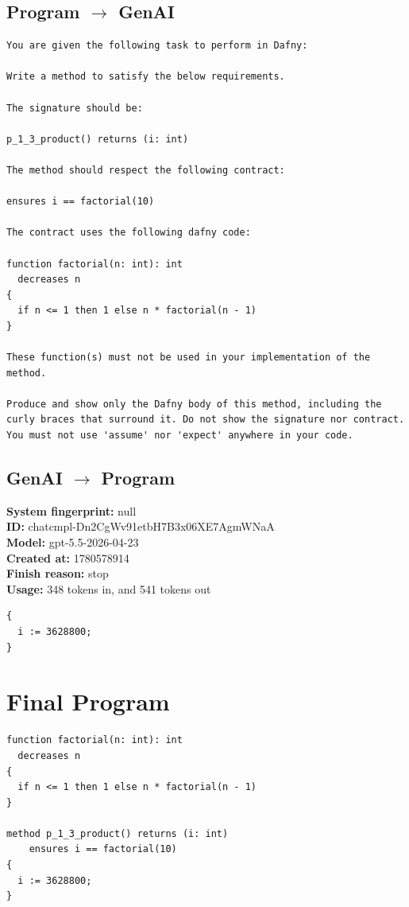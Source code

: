 \documentclass{article}
\begin{document}
\subsection*{Program $\rightarrow$ GenAI}
\begin{lstlisting}
You are given the following task to perform in Dafny:

Write a method to satisfy the below requirements.

The signature should be:

p_1_3_product() returns (i: int)

The method should respect the following contract:

ensures i == factorial(10)

The contract uses the following dafny code:

function factorial(n: int): int
  decreases n
{
  if n <= 1 then 1 else n * factorial(n - 1)
}

These function(s) must not be used in your implementation of the method.

Produce and show only the Dafny body of this method, including the curly braces that surround it. Do not show the signature nor contract. You must not use 'assume' nor 'expect' anywhere in your code.
\end{lstlisting}
\subsection*{GenAI $\rightarrow$ Program}
\textbf{System fingerprint: }null
\\\textbf{ID: }chatcmpl-Dn2CgWv91etbH7B3x06XE7AgmWNaA
\\\textbf{Model: }gpt-5.5-2026-04-23
\\\textbf{Created at: }1780578914
\\\textbf{Finish reason: }stop
\\\textbf{Usage: }348 tokens in, and 541 tokens out
\begin{lstlisting}
{
  i := 3628800;
}
\end{lstlisting}
\section*{Final Program}
\begin{lstlisting}
function factorial(n: int): int
  decreases n
{
  if n <= 1 then 1 else n * factorial(n - 1)
}

method p_1_3_product() returns (i: int)
	ensures i == factorial(10)
{
  i := 3628800;
}
\end{lstlisting}
\end{document}
